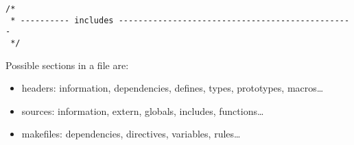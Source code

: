 \begin{verbatim}
/*
 * ---------- includes ------------------------------------------------
 */
\end{verbatim}

Possible sections in a file are:

\begin{itemize}

\item headers: information,  dependencies, defines, types, prototypes,
macros\ldots

\item sources: information, extern, globals, includes, functions\ldots

\item makefiles: dependencies, directives, variables, rules\ldots

\end{itemize}

